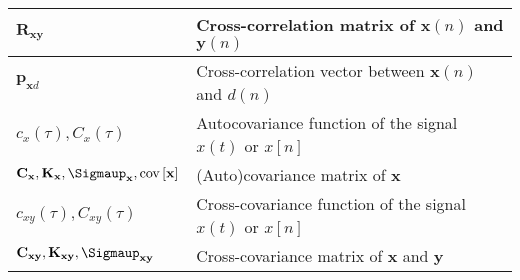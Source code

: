 \begin{xltabular}{\textwidth}{XX}
	\(\mathbf{R}_\mathbf{xy}\)                                                                                                    & Cross-correlation matrix of \(\mathbf{x}(n)\) and \(\mathbf{y}(n)\)                                                                                                                                                                \\ \hline
	\(\mathbf{p}_{\mathbf{x}d}\)                                                                                                  & Cross-correlation vector between \(\mathbf{x}(n)\) and \(d(n)\) \cite{dinizAdaptiveFiltering1997}                                                                                                                                  \\ \hline
	\(c_x(\tau), C_x(\tau)\)                                                                                                      & Autocovariance function of the signal \(x(t)\) or \(x[n]\) \cite{nossekAdaptiveArraySignal2015}                                                                                                                                    \\ \hline
	\(\mathbf{C}_\mathbf{x}, \mathbf{K}_\mathbf{x}, \boldsymbol{\Sigmaup}_\mathbf{x}, \textnormal{cov}\left[ \mathbf{x} \right]\) & (Auto)covariance matrix of \(\mathbf{x}\) \cite{vantreesOptimumArrayProcessing2002,proakisDigitalCommunications2007,leon-garciaProbabilityStatisticsRandom2007,haykinAdaptiveFilterTheory2002,bishopPatternRecognitionMachine2006} \\ \hline
	\(c_{xy}(\tau), C_{xy}(\tau)\)                                                                                                & Cross-covariance function of the signal \(x(t)\) or \(x[n]\) \cite{nossekAdaptiveArraySignal2015}                                                                                                                                  \\ \hline
	\(\mathbf{C}_{\mathbf{xy}}, \mathbf{K}_{\mathbf{xy}}, \boldsymbol{\Sigmaup}_{\mathbf{xy}}\)                                   & Cross-covariance matrix of \(\mathbf{x}\) and \(\mathbf{y}\)
\end{xltabular}

